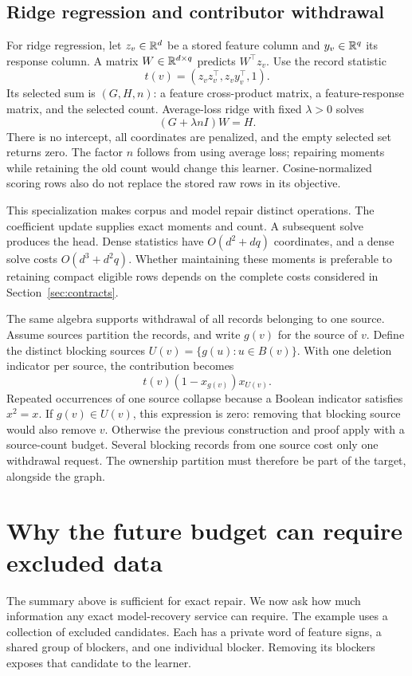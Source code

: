 \subsection{Ridge regression and contributor withdrawal}
For ridge regression, let $z_v\in\mathbb R^d$ be a stored feature column and
$y_v\in\mathbb R^q$ its response column. A matrix $W\in\mathbb R^{d\times q}$
predicts $W^\top z_v$. Use the record statistic
\[
              t(v)=(z_vz_v^\top,z_vy_v^\top,1).
\]
Its selected sum is $(G,H,n)$: a feature cross-product matrix, a
feature-response matrix, and the selected count. Average-loss ridge with
fixed $\lambda>0$ solves
\begin{equation}\label{eq:ridge}
                       (G+\lambda n I)W=H.
\end{equation}
There is no intercept, all coordinates are penalized, and the empty
selected set returns zero. The factor $n$ follows from using average loss;
repairing moments while retaining the old count would change this learner.
Cosine-normalized scoring rows also do not replace the stored raw rows in
its objective.

This specialization makes corpus and model repair distinct operations.
The coefficient update supplies exact moments and count. A subsequent
solve produces the head. Dense statistics have $O(d^2+dq)$ coordinates,
and a dense solve costs $O(d^3+d^2q)$. Whether maintaining these moments
is preferable to retaining compact eligible rows depends on the complete
costs considered in Section~\ref{sec:contracts}.

The same algebra supports withdrawal of all records belonging to one
source. Assume sources partition the records, and write $g(v)$ for the
source of $v$. Define the distinct blocking sources
$U(v)=\{g(u):u\in B(v)\}$. With one deletion indicator per source,
the contribution becomes
\[
                       t(v)(1-x_{g(v)})x_{U(v)}.
\]
Repeated occurrences of one source collapse because a Boolean indicator
satisfies $x^2=x$. If $g(v)\in U(v)$, this expression is zero: removing
that blocking source would also remove $v$. Otherwise the previous
construction and proof apply with a source-count budget. Several blocking
records from one source cost only one withdrawal request. The ownership
partition must therefore be part of the target, alongside the graph.

\section{Why the future budget can require excluded data}\label{sec:memory}
The summary above is sufficient for exact repair. We now ask how much
information any exact model-recovery service can require. The example
uses a collection of excluded candidates. Each has a private word of
feature signs, a shared group of blockers, and one individual blocker.
Removing its blockers exposes that candidate to the learner.

